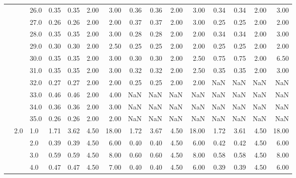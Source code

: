\begin{tabular}{lllrrrrrrrrrrrr}
       &     & 26.0 &       0.35 &      0.35 & 2.00 &   3.00 &       0.36 &      0.36 & 2.00 &   3.00 &       0.34 &      0.34 & 2.00 &   3.00 \\
       &     & 27.0 &       0.26 &      0.26 & 2.00 &   2.00 &       0.37 &      0.37 & 2.00 &   3.00 &       0.25 &      0.25 & 2.00 &   2.00 \\
       &     & 28.0 &       0.35 &      0.35 & 2.00 &   3.00 &       0.28 &      0.28 & 2.00 &   2.00 &       0.34 &      0.34 & 2.00 &   3.00 \\
       &     & 29.0 &       0.30 &      0.30 & 2.00 &   2.50 &       0.25 &      0.25 & 2.00 &   2.00 &       0.25 &      0.25 & 2.00 &   2.00 \\
       &     & 30.0 &       0.35 &      0.35 & 2.00 &   3.00 &       0.30 &      0.30 & 2.00 &   2.50 &       0.75 &      0.75 & 2.00 &   6.50 \\
       &     & 31.0 &       0.35 &      0.35 & 2.00 &   3.00 &       0.32 &      0.32 & 2.00 &   2.50 &       0.35 &      0.35 & 2.00 &   3.00 \\
       &     & 32.0 &       0.27 &      0.27 & 2.00 &   2.00 &       0.25 &      0.25 & 2.00 &   2.00 &        NaN &       NaN &  NaN &    NaN \\
       &     & 33.0 &       0.46 &      0.46 & 2.00 &   4.00 &        NaN &       NaN &  NaN &    NaN &        NaN &       NaN &  NaN &    NaN \\
       &     & 34.0 &       0.36 &      0.36 & 2.00 &   3.00 &        NaN &       NaN &  NaN &    NaN &        NaN &       NaN &  NaN &    NaN \\
       &     & 35.0 &       0.26 &      0.26 & 2.00 &   2.00 &        NaN &       NaN &  NaN &    NaN &        NaN &       NaN &  NaN &    NaN \\
       & 2.0 & 1.0  &       1.71 &      3.62 & 4.50 &  18.00 &       1.72 &      3.67 & 4.50 &  18.00 &       1.72 &      3.61 & 4.50 &  18.00 \\
       &     & 2.0  &       0.39 &      0.39 & 4.50 &   6.00 &       0.40 &      0.40 & 4.50 &   6.00 &       0.42 &      0.42 & 4.50 &   6.00 \\
       &     & 3.0  &       0.59 &      0.59 & 4.50 &   8.00 &       0.60 &      0.60 & 4.50 &   8.00 &       0.58 &      0.58 & 4.50 &   8.00 \\
       &     & 4.0  &       0.47 &      0.47 & 4.50 &   7.00 &       0.40 &      0.40 & 4.50 &   6.00 &       0.39 &      0.39 & 4.50 &   6.00 \\

\end{tabular}
